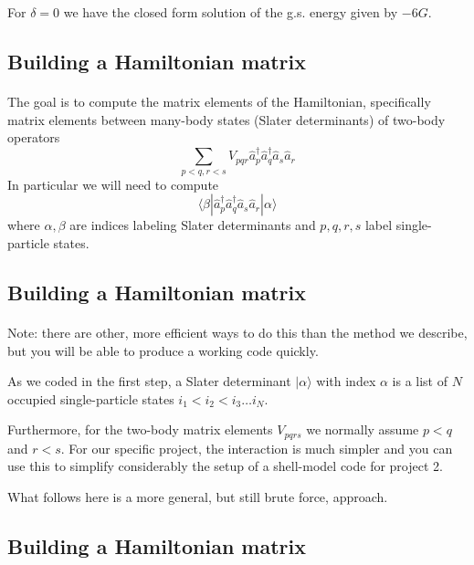 \documentclass[%
oneside,                 %
final,                   %
10pt]{article}
\begin{document}
For $\delta = 0$ we have the closed form solution of  the g.s. energy given by $-6G$.



\subsection*{Building a Hamiltonian matrix}

\paragraph{}
The goal is to compute the matrix elements of the Hamiltonian, specifically
matrix elements between many-body states (Slater determinants) of two-body
operators
\[
\sum_{p < q, r < s}V_{pqr} \hat{a}^\dagger_p \hat{a}^\dagger_q\hat{a}_s \hat{a}_r
\]
In particular we will need to compute
\[
\langle \beta | \hat{a}^\dagger_p \hat{a}^\dagger_q\hat{a}_s \hat{a}_r |\alpha \rangle
\]
where $\alpha, \beta$ are indices labeling Slater determinants and $p,q,r,s$ label
single-particle states.



\subsection*{Building a Hamiltonian matrix}

\paragraph{}
Note: there are other, more efficient ways to do this than the method we describe, 
but you will
be able to produce a working code quickly.

As we coded in the first step,
a Slater determinant $| \alpha \rangle$ with index $\alpha$ is a
list of $N$ occupied single-particle states $i_1 < i_2 < i_3 \ldots i_N$.

Furthermore, for the two-body matrix elements $V_{pqrs}$ we normally assume
$p < q$ and $r < s$. For our specific project, the interaction is much simpler and you can use this to simplify considerably the setup of a shell-model code for project 2.

What follows here is a more general, but still brute force, approach.



\subsection*{Building a Hamiltonian matrix}
\end{document}
